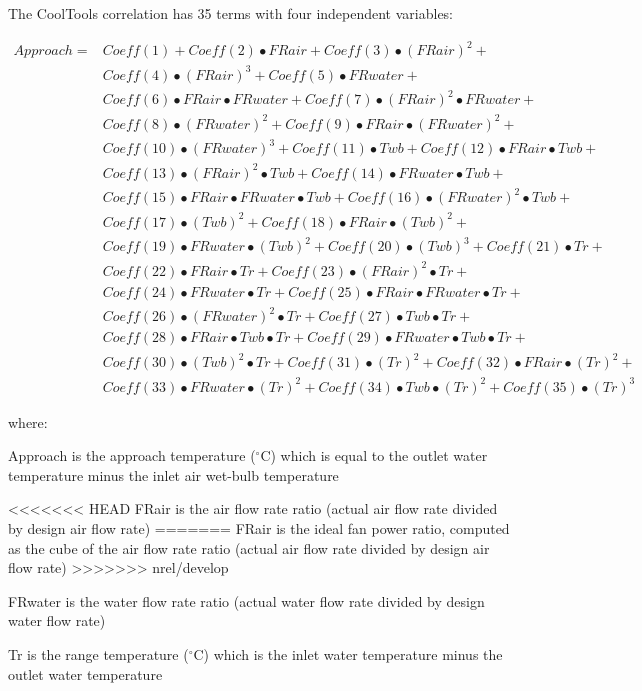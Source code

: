 The CoolTools correlation has 35 terms with four independent variables:

\begin{equation}
\begin{array}{rl}
Approach =& Coeff(1) + Coeff(2)•FRair + Coeff(3)•(FRair)^{2} + \\
 & Coeff(4)•(FRair)^{3} + Coeff(5)•FRwater + \\
 & Coeff(6)•FRair•FRwater + Coeff(7)•(FRair)^{2}•FRwater + \\
 & Coeff(8)•(FRwater)^{2} + Coeff(9)•FRair•(FRwater)^{2} + \\
 & Coeff(10)•(FRwater)^{3} + Coeff(11)•Twb + Coeff(12)•FRair•Twb + \\
 & Coeff(13)•(FRair)^{2}•Twb + Coeff(14)•FRwater•Twb + \\
 & Coeff(15)•FRair•FRwater•Twb + Coeff(16)•(FRwater)^{2}•Twb + \\
 & Coeff(17)•(Twb)^{2} + Coeff(18)•FRair•(Twb)^{2} + \\
 & Coeff(19)•FRwater•(Twb)^{2} + Coeff(20)•(Twb)^{3} + Coeff(21)•Tr +  \\
 & Coeff(22)•FRair•Tr + Coeff(23)•(FRair)^{2}•Tr + \\
 & Coeff(24)•FRwater•Tr + Coeff(25)•FRair•FRwater•Tr + \\
 & Coeff(26)•(FRwater)^{2}•Tr + Coeff(27)•Twb•Tr + \\
 & Coeff(28)•FRair•Twb•Tr + Coeff(29)•FRwater•Twb•Tr + \\
 & Coeff(30)•(Twb)^{2}•Tr + Coeff(31)•(Tr)^{2} + Coeff(32)•FRair•(Tr)^{2} + \\
 & Coeff(33)•FRwater•(Tr)^{2} + Coeff(34)•Twb•(Tr)^{2} + Coeff(35)•(Tr)^{3}
\end{array}
\end{equation}

where:

Approach is the approach temperature (\(^{\circ}\)C) which is equal to the outlet water temperature minus the inlet air wet-bulb temperature

<<<<<<< HEAD
FRair is the air flow rate ratio (actual air flow rate divided by design air flow rate)
=======
FRair is the ideal fan power ratio, computed as the cube of the air flow rate ratio (actual air flow rate divided by design air flow rate)
>>>>>>> nrel/develop

FRwater is the water flow rate ratio (actual water flow rate divided by design water flow rate)

Tr is the range temperature (\(^{\circ}\)C) which is the inlet water temperature minus the outlet water temperature

